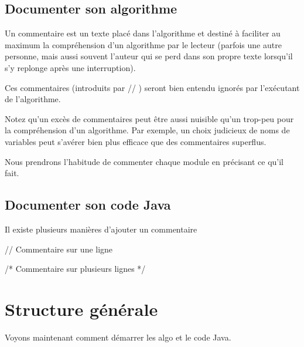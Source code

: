 \documentclass[11pt,a4paper]{article}
\begin{document}
            \par
        \subsection{Documenter son algorithme}
        Un commentaire est un texte plac\'e dans l'algorithme et destin\'e \`a faciliter au maximum 
        la compr\'ehension d'un algorithme par le lecteur (parfois une autre personne, 
        mais aussi souvent l'auteur qui se perd dans son propre texte lorsqu'il s'y replonge apr\`es une interruption). 
      
            \par
        
        Ces commentaires (introduits par \guillemotleft  // \guillemotright ) seront bien entendu ignor\'es par l'ex\'ecutant de l'algorithme.
      
            \par
        
        Notez qu'un exc\`es de commentaires peut \^etre aussi nuisible qu'un trop-peu pour la 
        compr\'ehension d'un algorithme. 
        Par exemple, un choix judicieux de noms de variables peut s'av\'erer bien plus efficace que des commentaires superflus.
      
            \par
        
        Nous prendrons l'habitude de commenter chaque module en pr\'ecisant ce qu'il fait.
      
            \par
        \subsection{Documenter son code Java}Il existe plusieurs mani\`eres d'ajouter un commentaire
            \par
        \begin{Java}
// Commentaire sur une ligne
\end{Java}\begin{Java}
  /* Commentaire sur
  plusieurs lignes */
\end{Java}\section{Structure g\'en\'erale}
				Voyons maintenant comment d\'emarrer les algo et le code Java.
      
            \par
\end{document}
